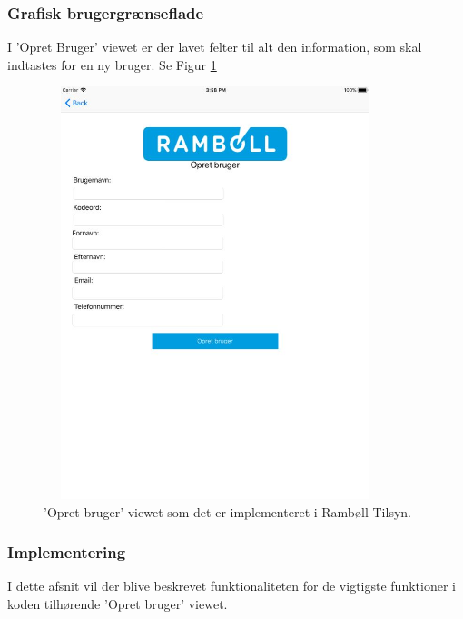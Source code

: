 \subsubsection{Grafisk brugergrænseflade}
I 'Opret Bruger' viewet er der lavet felter til alt den information, som skal indtastes for en ny bruger. Se Figur \ref{fig:OpretBrugerView}
\begin{figure}[H] %
	\centering
	\includegraphics[height=12cm, width=10cm]{../ArkitekturDesign/Design/OpretBruger/OpretBrugerView}
	\caption{'Opret bruger' viewet som det er implementeret i Rambøll Tilsyn.}
	\label{fig:OpretBrugerView}
\end{figure}

\clearpage

\subsubsection{Implementering}
I dette afsnit vil der blive beskrevet funktionaliteten for de vigtigste funktioner i koden tilhørende 'Opret bruger' viewet.

